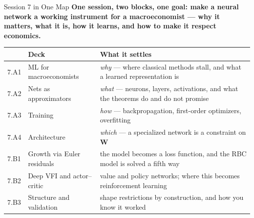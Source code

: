 \begin{frame}{Session 7 in One Map}
\small
\textbf{One session, two blocks, one goal: make a neural network a working instrument for a macroeconomist --- why it matters, what it is, how it learns, and how to make it respect economics.}
\medskip

\begin{center}\footnotesize
\begin{tabularx}{\linewidth}{@{}>{\raggedright\arraybackslash}p{1.1cm} >{\raggedright\arraybackslash}p{3.5cm} >{\raggedright\arraybackslash}X@{}}
\toprule
& \textbf{Deck} & \textbf{What it settles} \\
\midrule
7.A1 & ML for macroeconomists & \textit{why} --- where classical methods stall, and what a learned representation is \\
7.A2 & Nets as approximators & \textit{what} --- neurons, layers, activations, and what the theorems do and do not promise \\
7.A3 & Training & \textit{how} --- backpropagation, first-order optimizers, overfitting \\
7.A4 & Architecture & \textit{which} --- a specialized network is a constraint on $\mathbf{W}$ \\
\midrule
7.B1 & Growth via Euler residuals & the model becomes a loss function, and the RBC model is solved a fifth way \\
7.B2 & Deep VFI and actor--critic & value and policy networks; where this becomes reinforcement learning \\
7.B3 & Structure and validation & shape restrictions by construction, and how you know it worked \\
\bottomrule
\end{tabularx}
\end{center}
\end{frame}


